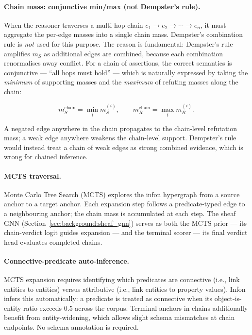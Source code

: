\paragraph{Chain mass: conjunctive min/max (not Dempster's rule).}
When the reasoner traverses a multi-hop chain
$e_1 \to e_2 \to \cdots \to e_n$, it must aggregate the per-edge masses into
a single chain mass.  Dempster's combination rule is \emph{not} used for this
purpose.  The reason is fundamental: Dempster's rule amplifies $m_S$ as
additional edges are combined, because each combination renormalises away
conflict.  For a chain of assertions, the correct semantics is conjunctive ---
``all hops must hold'' --- which is naturally expressed by taking the
\emph{minimum} of supporting masses and the \emph{maximum} of refuting masses
along the chain:

\[
  m_S^{\text{chain}} = \min_{i} m_S^{(i)},
  \qquad
  m_R^{\text{chain}} = \max_{i} m_R^{(i)}.
\]

A negated edge anywhere in the chain propagates to the chain-level refutation
mass; a weak edge anywhere weakens the chain-level support.  Dempster's rule
would instead treat a chain of weak edges as strong combined evidence, which
is wrong for chained inference.

\paragraph{MCTS traversal.}
Monte Carlo Tree Search (MCTS) explores the infon hypergraph from a source
anchor to a target anchor.  Each expansion step follows a predicate-typed edge
to a neighbouring anchor; the chain mass is accumulated at each step.  The
sheaf GNN (Section~\ref{sec:background:sheaf_gnn}) serves as both the MCTS
prior --- its chain-verdict logit guides expansion --- and the terminal scorer
--- its final verdict head evaluates completed chains.

\paragraph{Connective-predicate auto-inference.}
MCTS expansion requires identifying which predicates are connective (i.e.,
link entities to entities) versus attributive (i.e., link entities to
property values).  Infon infers this automatically: a predicate is treated
as connective when its object-is-entity ratio exceeds 0.5 across the corpus.
Terminal anchors in chains additionally benefit from entity-widening, which
allows slight schema mismatches at chain endpoints.  No schema annotation is
required.

